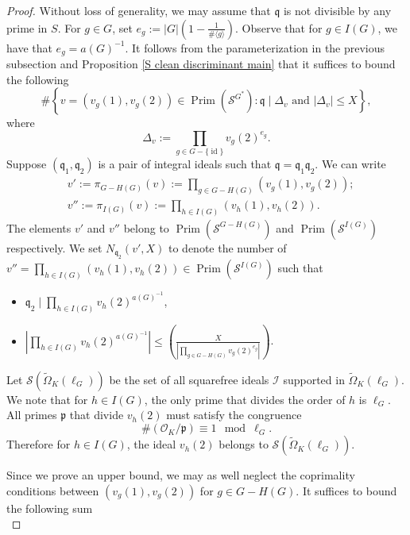 \documentclass[11pt]{amsart}
\newcommand{\fq}{\mathfrak{q}}
\newcommand{\cO}{\mathcal{O}}
\newcommand{\fp}{\mathfrak{p}}
\newcommand{\op}[1]{\operatorname{#1}}
\numberwithin{equation}{section}
\begin{document}
\begin{proof}
     Without loss of generality, we may assume that $\fq$ is not divisible by any prime in $S$. For $g\in G$, set $e_g := |G|\left(1-\frac{1}{\#\langle g \rangle}\right)$. Observe that for $g\in I(G)$, we have that $e_g=a(G)^{-1}$. It follows from the parameterization in the previous subsection and Proposition \ref{S clean discriminant main} that it suffices to bound the following
    \begin{equation}\label{begin-set}
        \#\left\{v=(v_{g}(1),v_{g}(2))\in \op{Prim}\left(\mathcal{S}^{G^\ast}\right):  \fq \mid \Delta_v \text{ and } |\Delta_v| \leq X \right\},
    \end{equation}
    where \[\Delta_v := \prod_{g \in G-\{\op{id}\}}v_g(2)^{e_g}.\]
     Suppose $(\fq_1, \fq_2)$ is a pair of integral ideals such that $\fq = \fq_1 \fq_2$. We can write 
    \[\begin{split}& v':=\pi_{G-H(G)}(v):=\prod_{g\in G-H(G)} (v_g(1), v_g(2));\\
    & v'':=\pi_{I(G)}(v):=\prod_{h\in I(G)} (v_h(1), v_h(2)).
    \end{split}\]The elements $v'$ and $v''$ belong to $\op{Prim}\left(\mathcal{S}^{G-H(G)}\right)$ and $\op{Prim}\left(\mathcal{S}^{I(G)}\right)$ respectively. We set $N_{\fq_2}(v',X)$ to denote the number of $v''=\prod_{h\in I(G)}(v_h(1), v_h(2))\in \op{Prim}\left(\mathcal{S}^{I(G)}\right)$ such that 
    \begin{itemize}
        \item $ \fq_2 \mid \prod_{h \in I(G)}v_h(2)^{a(G)^{-1}}$,
        \item $|\prod_{h \in I(G)}v_h(2)^{a(G)^{-1}}|\leq \left(\frac{X}{|\prod_{g \in G-H(G)}v_g(2)^{e_g}|}\right)$.
    \end{itemize}
Let $\mathcal{S}\left(\widetilde{\Omega}_K(\ell_G)\right) $ be the set of all squarefree ideals $\mathcal{I}$ supported in $\widetilde{\Omega}_K(\ell_G)$. We note that for $h\in I(G)$, the only prime that divides the order of $h$ is $\ell_G$. All primes $\fp$ that divide $v_h(2)$ must satisfy the congruence
\[\# \left(\cO_K/\fp\right)\equiv 1\mod{\ell_G}. \] Therefore for $h\in I(G)$, the ideal $v_h(2)$ belongs to $\mathcal{S}\left(\widetilde{\Omega}_K(\ell_G)\right)$.
\par Since we prove an upper bound, we may as well neglect the coprimality conditions between $(v_g(1), v_g(2))$ for $g\in G-H(G)$. It suffices to bound the following sum
    \begin{equation}\label{loc}

\end{equation}
\end{proof}
\end{document}
